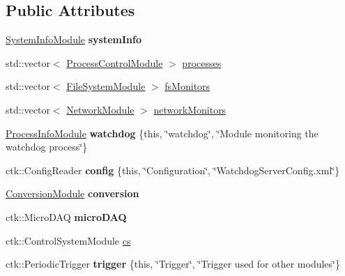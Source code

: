 \subsection*{Public Attributes}
\begin{DoxyCompactItemize}
\item 
\hyperlink{classSystemInfoModule}{System\+Info\+Module} {\bfseries system\+Info}
\item 
std\+::vector$<$ \hyperlink{structProcessControlModule}{Process\+Control\+Module} $>$ \hyperlink{structWatchdogServer_af21c89fb581f3f8ff9d3cf02509634c1}{processes}
\item 
std\+::vector$<$ \hyperlink{structFileSystemModule}{File\+System\+Module} $>$ \hyperlink{structWatchdogServer_a6dea91943e4456bf4ca8f9f4995ec6d2}{fs\+Monitors}
\item 
std\+::vector$<$ \hyperlink{structNetworkModule}{Network\+Module} $>$ \hyperlink{structWatchdogServer_a9a96dd4fa6053b7b783e43c5d446d7f0}{network\+Monitors}
\item 
\hyperlink{structProcessInfoModule}{Process\+Info\+Module} {\bfseries watchdog} \{this, \char`\"{}watchdog\char`\"{}, \char`\"{}Module monitoring the watchdog process\char`\"{}\}\hypertarget{structWatchdogServer_a5284e735372ca5947a8105ad3167c54a}{}\label{structWatchdogServer_a5284e735372ca5947a8105ad3167c54a}

\item 
ctk\+::\+Config\+Reader {\bfseries config} \{this, \char`\"{}Configuration\char`\"{}, \char`\"{}Watchdog\+Server\+Config.\+xml\char`\"{}\}\hypertarget{structWatchdogServer_aff0de39ddfc412f63c5ea21dafc89ddd}{}\label{structWatchdogServer_aff0de39ddfc412f63c5ea21dafc89ddd}

\item 
\hyperlink{structConversionModule}{Conversion\+Module} {\bfseries conversion}\hypertarget{structWatchdogServer_afa7e520c6049b1574c429f776196de6c}{}\label{structWatchdogServer_afa7e520c6049b1574c429f776196de6c}

\item 
ctk\+::\+Micro\+D\+AQ {\bfseries micro\+D\+AQ}\hypertarget{structWatchdogServer_a886ae70481b26aa4a59915f3c0e28a56}{}\label{structWatchdogServer_a886ae70481b26aa4a59915f3c0e28a56}

\item 
ctk\+::\+Control\+System\+Module \hyperlink{structWatchdogServer_ac2a80d4a412c142f8d4753b51e12bfa3}{cs}
\item 
ctk\+::\+Periodic\+Trigger {\bfseries trigger} \{this, \char`\"{}Trigger\char`\"{}, \char`\"{}Trigger used for other modules\char`\"{}\}\hypertarget{structWatchdogServer_ad28386ab5c73d0f07dbafd7a6a738cfb}{}\label{structWatchdogServer_ad28386ab5c73d0f07dbafd7a6a738cfb}

\end{DoxyCompactItemize}


